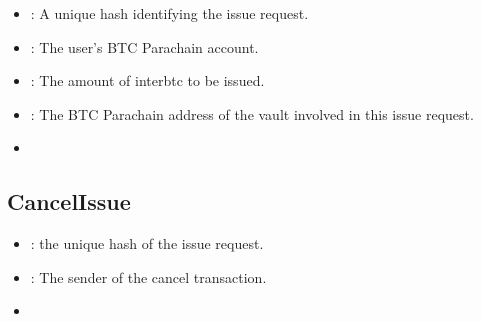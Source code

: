 \documentclass[a4paper,10pt,english]{sphinxmanual}
\begin{document}
\begin{itemize}
\item {} 
: A unique hash identifying the issue request.

\item {} 
: The user’s BTC Parachain account.

\item {} 
: The amount of interbtc to be issued.

\item {} 
: The BTC Parachain address of the vault involved in this issue request.

\end{itemize}

\begin{itemize}
\item {} 
{\hyperref[\detokenize{spec/issue:executeissue}]{}}

\end{itemize}


\subsection{CancelIssue}
\label{\detokenize{spec/issue:id14}}


\begin{itemize}
\item {} 
: the unique hash of the issue request.

\item {} 
: The sender of the cancel transaction.

\end{itemize}

\begin{itemize}
\item {} 
{\hyperref[\detokenize{spec/issue:cancelissue}]{}}

\end{itemize}
\end{document}
